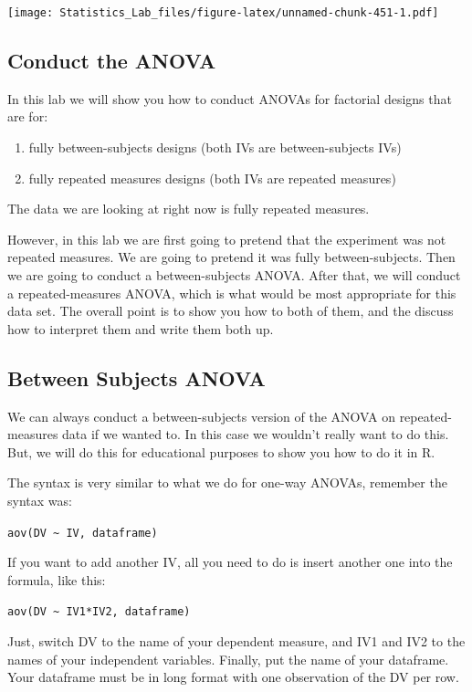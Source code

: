 \documentclass[
]{book}
\providecommand{\tightlist}{%
  \setlength{\itemsep}{0pt}\setlength{\parskip}{0pt}}
\begin{document}
\texttt{[image: Statistics\_Lab\_files/figure-latex/unnamed-chunk-451-1.pdf]}

\hypertarget{conduct-the-anova-1}{%
\subsection{Conduct the ANOVA}\label{conduct-the-anova-1}}

In this lab we will show you how to conduct ANOVAs for factorial designs that are for:

\begin{enumerate}
\def\labelenumi{\arabic{enumi}.}
\tightlist
\item
  fully between-subjects designs (both IVs are between-subjects IVs)
\item
  fully repeated measures designs (both IVs are repeated measures)
\end{enumerate}

The data we are looking at right now is fully repeated measures.

However, in this lab we are first going to pretend that the experiment was not repeated measures. We are going to pretend it was fully between-subjects. Then we are going to conduct a between-subjects ANOVA. After that, we will conduct a repeated-measures ANOVA, which is what would be most appropriate for this data set. The overall point is to show you how to both of them, and the discuss how to interpret them and write them both up.

\hypertarget{between-subjects-anova}{%
\subsection{Between Subjects ANOVA}\label{between-subjects-anova}}

We can always conduct a between-subjects version of the ANOVA on repeated-measures data if we wanted to. In this case we wouldn't really want to do this. But, we will do this for educational purposes to show you how to do it in R.

The syntax is very similar to what we do for one-way ANOVAs, remember the syntax was:

\texttt{aov(DV\ \textasciitilde{}\ IV,\ dataframe)}

If you want to add another IV, all you need to do is insert another one into the formula, like this:

\texttt{aov(DV\ \textasciitilde{}\ IV1*IV2,\ dataframe)}

Just, switch DV to the name of your dependent measure, and IV1 and IV2 to the names of your independent variables. Finally, put the name of your dataframe. Your dataframe must be in long format with one observation of the DV per row.
\end{document}
